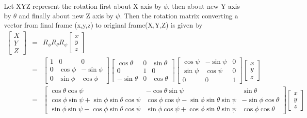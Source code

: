 \documentclass{article}
\begin{document}
 Let XYZ represent the rotation first about X axis by $\phi$, then about new Y axis by $\theta$ and finally about new Z axis by $\psi$. Then the rotation matrix converting a vector from final frame (x,y,z) to original frame(X,Y,Z) is given by
 \begin{eqnarray}
 	\begin{bmatrix}
 	X\\Y\\Z
 	\end{bmatrix} &=& R_{\phi}R_{\theta}R_{\psi}\begin{bmatrix}
 	x\\y\\z
 	\end{bmatrix}\\
 	 &=& \begin{bmatrix}
 	   1 & 0 & 0\\
 	   0 & \cos\phi & -\sin\phi\\
 	   0 & \sin\phi & \cos\phi 
 	\end{bmatrix}\begin{bmatrix}
 	\cos\theta & 0 & \sin\theta\\
 	0 & 1 & 0\\
 	-\sin\theta & 0 & \cos\theta
 	\end{bmatrix}\begin{bmatrix}
 	\cos\psi & -\sin\psi & 0\\
 	\sin\psi & \cos\psi & 0\\
 	0 & 0 & 1 
 	\end{bmatrix}\begin{bmatrix}
 	x\\y\\z
 	\end{bmatrix}\\
 	&=& \begin{bmatrix}
 	    \cos\theta\cos\psi & -\cos\theta\sin\psi & \sin\theta \\
 	    \cos\phi\sin\psi+\sin\phi\sin\theta\cos\psi & \cos\phi\cos\psi-\sin\phi\sin\theta\sin\psi & -\sin\phi\cos\theta \\
 	    \sin\phi\sin\psi-\cos\phi\sin\theta\cos\psi & \sin\phi\cos\psi+\cos\phi\sin\theta\sin\psi & \cos\phi\cos\theta
 	\end{bmatrix}\begin{bmatrix}
 	x\\y\\z
 	\end{bmatrix}
 \end{eqnarray}
 
\end{document}
